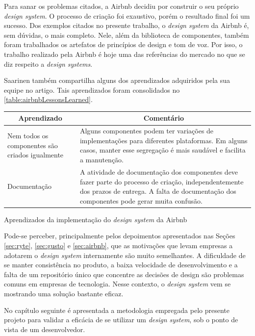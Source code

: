 Para sanar os problemas citados, a Airbnb decidiu por construir o seu próprio \textit{design system}. O processo de criação foi exaustivo, porém o resultado final foi um sucesso. Dos exemplos citados no presente trabalho, o \textit{design system} da Airbnb é, sem dúvidas, o mais completo. Nele, além da biblioteca de componentes, também foram trabalhados os artefatos de princípios de design e tom de voz. Por isso, o trabalho realizado pela Airbnb é hoje uma das referências do mercado no que se diz respeito a \textit{design systems}.

Saarinen também compartilha alguns dos aprendizados adquiridos pela sua equipe no artigo. Tais aprendizados foram consolidados no \autoref{table:airbnbLessonsLearned}.

\begin{quadro}
\centering
\begin{tabular}{|m{4cm}|m{10cm}|} \hline
	
	\multicolumn{1}{|c|}{\bfseries Aprendizado} & \multicolumn{1}{c|}{\bfseries Comentário} \\\hline
	
	 Nem todos os componentes são criados igualmente & Alguns componentes podem ter variações de implementações para diferentes plataformas. Em alguns casos, manter esse segregação é mais saudável e facilita a manutenção. \\\hline
	 
	 Documentação & A atividade de documentação dos componentes deve fazer parte do processo de criação, independentemente dos prazos de entrega. A falta de documentação dos componentes pode gerar muita confusão. \\\hline
    
\end{tabular}
\caption{Aprendizados da implementação do \textit{design system} da Airbnb}
\label{table:airbnbLessonsLearned}
\end{quadro}

Pode-se perceber, principalmente pelos depoimentos apresentados nas Seções \ref{sec:ryte}, \ref{sec:gusto} e \ref{sec:airbnb}, que as motivações que levam empresas a adotarem o \textit{design system} internamente são muito semelhantes. A dificuldade de se manter consistência no produto, a baixa velocidade de desenvolvimento e a falta de um repositório único que concentre as decisões de design são problemas comuns em empresas de tecnologia. Nesse contexto, o \textit{design system} vem se mostrando uma solução bastante eficaz.

No capítulo seguinte é apresentada a metodologia empregada pelo presente projeto para validar a eficácia de se utilizar um \textit{design system}, sob o ponto de vista de um desenvolvedor.

